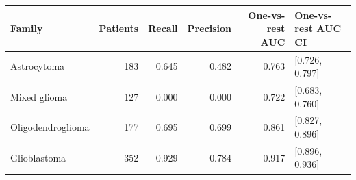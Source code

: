 \begin{tabular}{lrrrrl}
\toprule
\textbf{Family} & \textbf{Patients} & \textbf{Recall} & \textbf{Precision} & \textbf{One-vs-rest AUC} & \textbf{One-vs-rest AUC CI} \\
\midrule
Astrocytoma & 183 & 0.645 & 0.482 & 0.763 & [0.726, 0.797] \\
Mixed glioma & 127 & 0.000 & 0.000 & 0.722 & [0.683, 0.760] \\
Oligodendroglioma & 177 & 0.695 & 0.699 & 0.861 & [0.827, 0.896] \\
Glioblastoma & 352 & 0.929 & 0.784 & 0.917 & [0.896, 0.936] \\
\bottomrule
\end{tabular}
